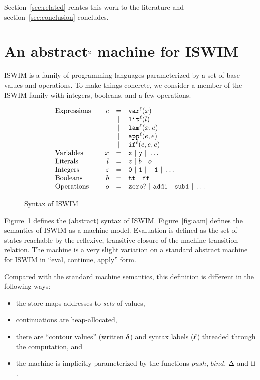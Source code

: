 \documentclass[preprint,onecolumn,9pt]{sigplanconf} %
\begin{document}
Section~\ref{sec:related} relates this work to the literature and
section~\ref{sec:conclusion} concludes.



\section{An abstract$^{\text 2}$ machine for ISWIM}
\label{sec:aam}


ISWIM is a family of programming languages parameterized by a set of
base values and operations.  To make things concrete, we consider a
member of the ISWIM family with integers, booleans, and a few
operations.

\begin{figure}
\[
\begin{array}{l@{\qquad}rcl}
\text{Expressions} & \mathit{e} &=& \svar[^\mlab]\mvar\\
&&|& \slit[^\mlab]\mlit\\
&&|& \slam[^\mlab]\mvar\mexp\\
&&|& \sapp[^\mlab]\mexp\mexp \\
&&|& \sif[^\mlab]\mexp\mexp\mexp \\
\text{Variables}&\mvar &=& \syntax{x}\ |\ \syntax{y}\ |\ \dots\\
\text{Literals}&\mlit &=& \mnum\ |\ \mbln\ |\ \mop\\
\text{Integers}&\mnum &=& \syntax{0}\ |\ \syntax{1}\ |\ \syntax{-1}\ |\ \dots\\
\text{Booleans}&\mbln &=& \strue\ |\ \sfalse\\
\text{Operations}&\mop &=& \syntax{zero?}\ |\ \syntax{add1}\ |\ \syntax{sub1}\ |\ \dots
\end{array}
\]
\caption{Syntax of ISWIM}
\label{fig:syntax}
\end{figure}

Figure~\ref{fig:syntax} defines the (abstract) syntax of ISWIM.
Figure~\ref{fig:aam} defines the semantics of ISWIM as a machine
model.  Evaluation is defined as the set of states reachable by the
reflexive, transitive closure of the machine transition relation.  The
machine is a very slight variation on a standard abstract machine for
ISWIM in ``eval, continue, apply'' form.

Compared with the standard machine semantics, this definition is
different in the following ways:
\begin{itemize}
\item the store maps addresses to \emph{sets} of values,
\item continuations are heap-allocated,
\item there are ``contour values'' (written ${\delta}$) and syntax
  labels (${\ell}$) threaded through the computation, and
\item the machine is implicitly parameterized by the functions
  $\mathit{push}$, $\mathit{bind}$, $\Delta$ and $\sqcup$.
\end{itemize}
\end{document}
